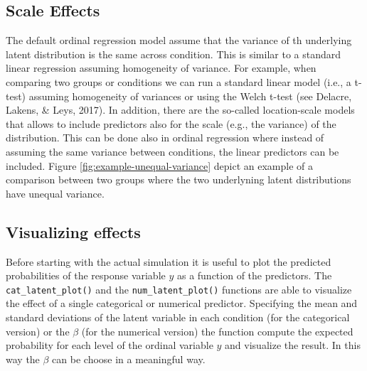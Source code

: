 \documentclass[
  man,floatsintext]{apa6}
\begin{document}
\subsection{Scale Effects}\label{scale-effects}

The default ordinal regression model assume that the variance of th underlying latent distribution is the same across condition. This is similar to a standard linear regression assuming homogeneity of variance. For example, when comparing two groups or conditions we can run a standard linear model (i.e., a t-test) assuming homogeneity of variances or using the Welch t-test (see Delacre, Lakens, \& Leys, 2017). In addition, there are the so-called location-scale models that allows to include predictors also for the scale (e.g., the variance) of the distribution. This can be done also in ordinal regression where instead of assuming the same variance between conditions, the linear predictors can be included. Figure \ref{fig:example-unequal-variance} depict an example of a comparison between two groups where the two underlyning latent distributions have unequal variance.

\subsection{Visualizing effects}\label{visualizing-effects}

Before starting with the actual simulation it is useful to plot the predicted probabilities of the response variable \(y\) as a function of the predictors. The \texttt{cat\_latent\_plot()} and the \texttt{num\_latent\_plot()} functions are able to visualize the effect of a single categorical or numerical predictor. Specifying the mean and standard deviations of the latent variable in each condition (for the categorical version) or the \(\beta\) (for the numerical version) the function compute the expected probability for each level of the ordinal variable \(y\) and visualize the result. In this way the \(\beta\) can be choose in a meaningful way.
\end{document}
